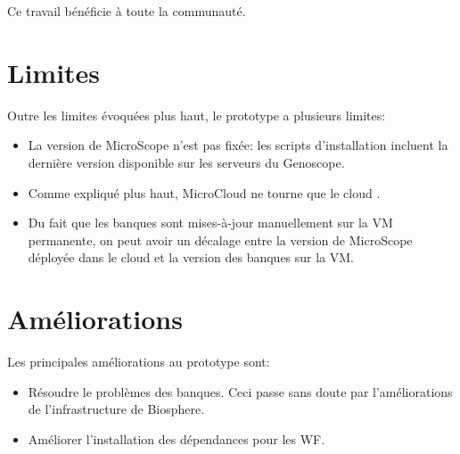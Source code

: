 Ce travail bénéficie à toute la communauté.

\section{Limites}

Outre les limites évoquées plus haut, le prototype a plusieurs limites:
\begin{itemize}
	\item La version de MicroScope n'est pas fixée: les scripts d'installation incluent la dernière version disponible sur les serveurs du Genoscope.
	\item Comme expliqué plus haut, MicroCloud ne tourne que le cloud .
	\item Du fait que les banques sont mises-à-jour manuellement sur la VM permanente, on peut avoir un décalage entre la version de MicroScope déployée dans le cloud
	      et la version des banques sur la VM.
\end{itemize}

\section{Améliorations}

Les principales améliorations au prototype sont:
\begin{itemize}
	\item Résoudre le problèmes des banques.
	      Ceci passe sans doute par l'améliorations de l'infrastructure de Biosphere.
	\item Améliorer l'installation des dépendances pour les WF.
\end{itemize}
\bigskip

\bigskip

